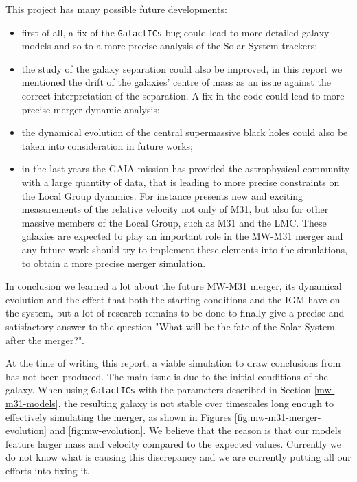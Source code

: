\documentclass[a4paper,12pt, english]{article}
\begin{document}
\smallskip
This project has many possible future developments:
\begin{itemize}
    \item first of all, a fix of the \texttt{GalactICs} bug could lead to more detailed galaxy models and so to a more precise analysis of the Solar System trackers;
    \item the study of the galaxy separation could also be improved, in this report we mentioned the drift of the galaxies' centre of mass as an issue against the correct interpretation of the separation. A fix in the code could lead to more precise merger dynamic analysis;
    \item the dynamical evolution of the central supermassive black holes could also be taken into consideration in future works;
    \item in the last years the GAIA mission has provided the astrophysical community with a large quantity of data, that is leading to more precise constraints on the Local Group dynamics. For instance \textcite{van_der_Marel_2019} presents new and exciting measurements of the relative velocity not only of M31, but also for other massive members of the Local Group, such as M31 and the LMC. These galaxies are expected to play an important role in the MW-M31 merger and any future work should try to implement these elements into the simulations, to obtain a more precise merger simulation.
\end{itemize}\par
\smallskip
In conclusion we learned a lot about the future MW-M31 merger, its dynamical evolution and the effect that both the starting conditions and the IGM have on the system, but a lot of research remains to be done to finally give a precise and satisfactory answer to the question "What will be the fate of the Solar System after the merger?".



\iffalse At the time of writing this report, a viable simulation to draw conclusions from has not been produced. The main issue is due to the initial conditions of the galaxy. When using \texttt{GalactICs} with the parameters described in Section \ref{mw-m31-models}, the resulting galaxy is not stable over timescales long enough to effectively simulating the merger, as shown in Figures \ref{fig:mw-m31-merger-evolution} and \ref{fig:mw-evolution}. We believe that the reason is that our models feature larger mass and velocity compared to the expected values. Currently we do not know what is causing this discrepancy and we are currently putting all our efforts into fixing it.\par
\smallskip
\end{document}
